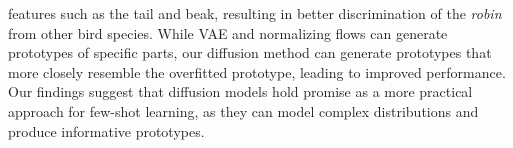 \begin{table}
\vspace{-3mm}
\caption{\textbf{Benefit of diffusion model} over 
other generative models on  \textit{mini}Imagenet.}
\centering
{}
\label{tab:ab_diff}
\end{table}
features such as the tail and beak, resulting in better discrimination of the \textit{robin} from other bird species. While VAE and normalizing flows can generate prototypes of specific parts, our diffusion method can generate prototypes that more closely resemble the overfitted prototype, leading to improved performance.
Our findings suggest that diffusion models hold promise as a more practical approach for few-shot learning, as they can model complex distributions and produce informative prototypes.







